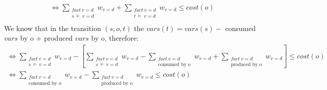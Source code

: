 \documentclass[11pt,a4paper]{article}
\begin{document}
\begin{equation*}
	\begin{aligned}
		\iff \sum_{\substack{fact\:v=d \\ s\:\models\: v=d}} w_{v=d} + \sum_{\substack{fact\:v=d \\ t\: \models\: v=d}} w_{v=d} \leq cost(o)\\
	\end{aligned}
\end{equation*}
We know that in the transition $(s, o, t)$ the $vars(t) = vars(s) -$ consumed $vars$ by o $+$ produced $vars$ by o, therefore:
\begin{equation*}
	\begin{aligned}
		\iff \sum_{\substack{fact\:v=d \\ s\:\models\: v=d}} w_{v=d} - 
			  \left[ \sum_{\substack{fact\:v=d \\ s\:\models \: v=d}} w_{v=d} - 
			  \sum_{\substack{fact\:v=d \\ \text{consumed by o}}} w_{v=d} + 
			  \sum_{\substack{fact\:v=d\\ \text{produced by o}}} w_{v=d} \right] \leq cost(o) \\
		\iff \sum_{\substack{fact\:v=d \\ \text{consumed by o}}} w_{v=d} -
			 \sum_{\substack{fact\:v=d\\ \text{produced by o}}} w_{v=d} \leq cost(o) 
	\end{aligned}
\end{equation*}
\end{document}
